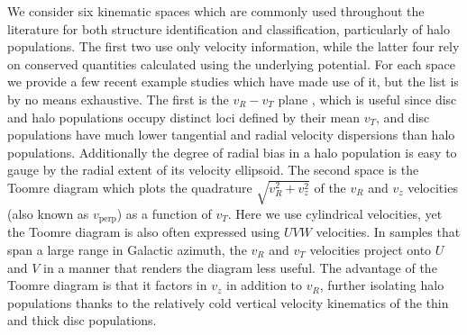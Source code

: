 We consider six kinematic spaces which are commonly used throughout the literature for both structure identification and classification, particularly of halo populations. The first two use only velocity information, while the latter four rely on conserved quantities calculated using the underlying potential. For each space we provide a few recent example studies which have made use of it, but the list is by no means exhaustive. The first is the $v_{R}-v_{T}$ plane \parencite[e.g. ][]{belokurov18, fattahi19,lancaster19,mackereth19a,belokurov20, feuillet20}, which is useful since disc and halo populations occupy distinct loci defined by their mean $v_{T}$, and disc populations have much lower tangential and radial velocity dispersions than halo populations. Additionally the degree of radial bias in a halo population is easy to gauge by the radial extent of its velocity ellipsoid. The second space is the Toomre diagram \parencite[e.g. ][]{hawkins15,helmi18,koppelman19b,feuillet20,cordoni20} which plots the quadrature $\sqrt{v_R^2+v_z^2}$ of the $v_{R}$ and $v_{z}$ velocities (also known as $v_\mathrm{perp}$) as a function of $v_{T}$. Here we use cylindrical velocities, yet the Toomre diagram is also often expressed using $UVW$ velocities. In samples that span a large range in Galactic azimuth, the $v_R$ and $v_T$ velocities project onto $U$ and $V$ in a manner that renders the diagram less useful. The advantage of the Toomre diagram is that it factors in $v_{z}$ in addition to $v_{R}$, further isolating halo populations thanks to the relatively cold vertical velocity kinematics of the thin and thick disc populations.

